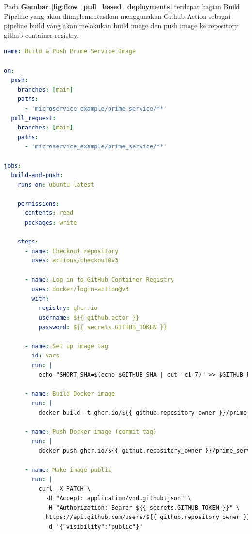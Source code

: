 Pada \textbf{Gambar \ref{fig:flow_pull_based_deployments}} terdapat bagian
Build Pipeline yang akan diimplementasikan menggunakan Github Action sebagai
pipeline build yang akan melakukan build image dan push image ke repository
github container registry.
\begin{lstlisting}[language=yaml, 
  basicstyle=\footnotesize\ttfamily,
  caption={Salah Satu Contoh Implementasi Build Pipeline pada Prime Service},
  label={lst:build-pipeline}]
name: Build & Push Prime Service Image

on:
  push:
    branches: [main]
    paths:
      - 'microservice_example/prime_service/**'
  pull_request:
    branches: [main]
    paths:
      - 'microservice_example/prime_service/**'

jobs:
  build-and-push:
    runs-on: ubuntu-latest

    permissions:
      contents: read
      packages: write

    steps:
      - name: Checkout repository
        uses: actions/checkout@v3

      - name: Log in to GitHub Container Registry
        uses: docker/login-action@v3
        with:
          registry: ghcr.io
          username: ${{ github.actor }}
          password: ${{ secrets.GITHUB_TOKEN }}

      - name: Set up image tag
        id: vars
        run: |
          echo "SHORT_SHA=$(echo $GITHUB_SHA | cut -c1-7)" >> $GITHUB_ENV

      - name: Build Docker image
        run: |
          docker build -t ghcr.io/${{ github.repository_owner }}/prime_service:${{ env.SHORT_SHA }} microservice_example/prime_service

      - name: Push Docker image (commit tag)
        run: |
          docker push ghcr.io/${{ github.repository_owner }}/prime_service:${{ env.SHORT_SHA }}

      - name: Make image public
        run: |
          curl -X PATCH \
            -H "Accept: application/vnd.github+json" \
            -H "Authorization: Bearer ${{ secrets.GITHUB_TOKEN }}" \
            https://api.github.com/users/${{ github.repository_owner }}/packages/container/prime_service/visibility \
            -d '{"visibility":"public"}'
\end{lstlisting}

